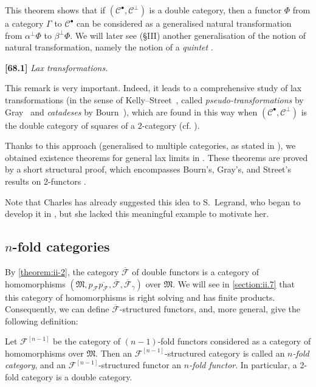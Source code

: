 \documentclass[a4paper,fleqn]{article}
\theoremstyle{plain}
\theoremstyle{definition}
\newenvironment{definition}[1]
  {\renewcommand\theinnerdefinition{#1}\innerdefinition}
  {\endinnerdefinition}
\newenvironment{longcomm}[1]
  {\noindent\textbf{[#1]}\rmfamily}
  {}
\newcommand{\CC}{\mathcal{C}}
\newcommand{\MM}{\mathfrak{M}}
\newcommand{\FF}{\mathcal{F}}
\begin{document}
This theorem shows that if $(\CC^\bullet,\CC^\perp)$ is a double category, then a functor $\Phi$ from a category $\Gamma$ to $\CC^\bullet$ can be considered as a generalised natural transformation from $\alpha^\perp\Phi$ to $\beta^\perp\Phi$.
We will later see ({§III}) another generalisation of the notion of natural transformation, namely the notion of a \emph{quintet} \cite{3e}.

\begin{longcomm}{68.1}
  \emph{Lax transformations.}

  This remark is very important.
  Indeed, it leads to a comprehensive study of lax transformations (in the sense of Kelly--Street~\cite{comm59}, called \emph{pseudo-transformations} by Gray~\cite{comm40} and \emph{catadeses} by Bourn~\cite{comm14}), which are found in this way when $(\CC^\bullet,\CC^\perp)$ is the double category of squares of a 2-category (cf. \cite[Comment~105.1]{coll64}).

  Thanks to this approach (generalised to multiple categories, as stated in \cite[Remark~3, p.~399]{coll117}), we obtained existence theorems for general lax limits in \cite{coll119,coll121}.
  These theorems are proved by a short structural proof, which encompasses Bourn's, Gray's, and Street's results on 2-functors \cite{comm14,comm40,comm92}.

  Note that Charles has already suggested this idea to S.~Legrand, who began to develop it in \cite{comm67}, but she lacked this meaningful example to motivate her.
\end{longcomm}


\subsection{$n$-fold categories}
\label{section:ii.5}

By \cref{theorem:ii-2}, the category $\overline{\FF}$ of double functors is a category of homomorphisms $(\MM,p_\FF\overline{p_\FF},\overline{\FF},\overline{\FF}_\gamma)$ over $\MM$.
We will see in \cref{section:ii.7} that this category of homomorphisms is right solving and has finite products.
Consequently, we can define $\overline{\FF}$-structured functors, and, more general, give the following definition:

\begin{definition}{15}
\label{definition:ii-15}
  Let $\FF^{[n-1]}$ be the category of $(n-1)$-fold functors considered as a category of homomorphisms over $\MM$.
  Then an $\FF^{[n-1]}$-structured category is called an \emph{$n$-fold category}, and an $\FF^{[n-1]}$-structured functor an \emph{$n$-fold functor}.
  In particular, a 2-fold category is a double category.
\end{definition}
\end{document}
